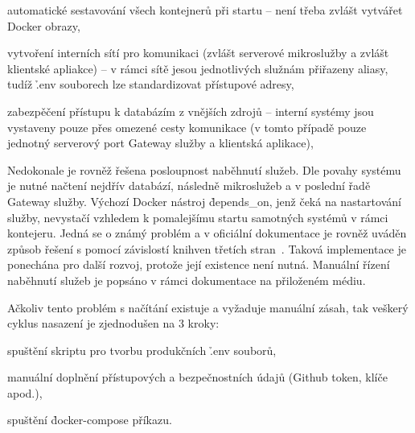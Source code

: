 \begin{ul}
   \item automatické sestavování všech kontejnerů při startu – není třeba zvlášt vytvářet Docker obrazy,
   \item vytvoření interních sítí pro komunikaci (zvlášt serverové mikroslužby a zvlášt klientské apliakce) – v rámci sítě jesou jednotlivých služnám přiřazeny aliasy, tudíž \h{.env} souborech lze standardizovat přístupové adresy,
   \item zabezpěčení přístupu k databázím z vnějších zdrojů – interní systémy jsou vystaveny pouze přes omezené cesty komunikace (v tomto případě pouze jednotný serverový port Gateway služby a klientská aplikace),
\end{ul}

Nedokonale je rovněž řešena posloupnost naběhnutí služeb.
Dle povahy systému je nutné načtení nejdřív databází, následně mikroslužeb a v poslední řadě Gateway služby.
Výchozí Docker nástroj \h{depends\_on}, jenž čeká na nastartování služby, nevystačí vzhledem k pomalejšímu startu samotných systémů v rámci kontejeru.
Jedná se o známý problém a v oficiální dokumentace je rovněž uváděn způsob řešení s pomocí závislostí knihven třetích stran~\cite{dockerorder}.
Taková implementace je ponechána pro další rozvoj, protože její existence není nutná.
Manuální řízení naběhnutí služeb je popsáno v rámci dokumentace na přiloženém médiu.

Ačkoliv tento problém s načítání existuje a vyžaduje manuální zásah, tak veškerý cyklus nasazení je zjednodušen na 3 kroky:

\begin{ul}
   \item spuštění skriptu pro tvorbu produkčních \h{.env} souborů,
   \item manuální doplnění přístupových a bezpečnostních údajů (Github token, klíče apod.),
   \item spuštění \h{docker-compose} příkazu.
\end{ul}
